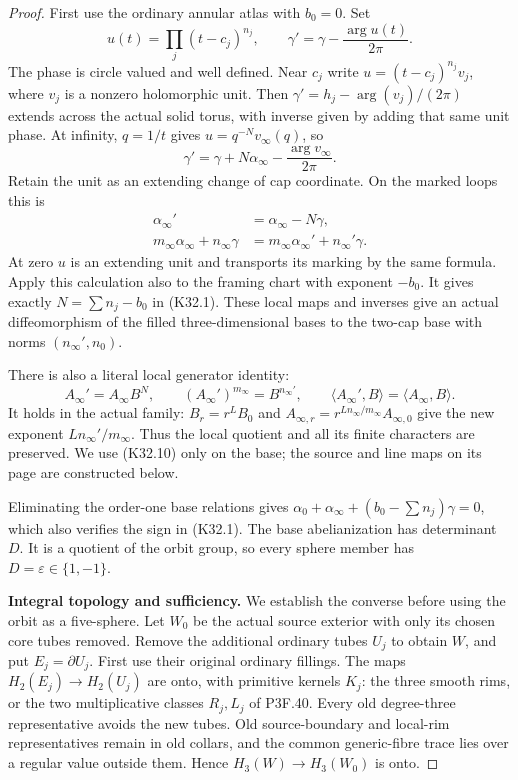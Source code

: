 \begin{proof}
First use the ordinary annular atlas with $b_0=0$. Set
\[
 u(t)=\prod_j(t-c_j)^{n_j},\qquad
 \gamma'=\gamma-\frac{\arg u(t)}{2\pi}.                 \tag{K32.10}
\]
The phase is circle valued and well defined. Near $c_j$
write $u=(t-c_j)^{n_j}v_j$, where $v_j$ is a nonzero
holomorphic unit. Then
$\gamma'=h_j-\arg(v_j)/(2\pi)$ extends across the actual
solid torus, with inverse given by adding that same unit
phase. At infinity, $q=1/t$ gives $u=q^{-N}v_\infty(q)$,
so
\[
 \gamma'=\gamma+N\alpha_\infty
                         -\frac{\arg v_\infty}{2\pi}.
\]
Retain the unit as an extending change of cap coordinate.
On the marked loops this is
\[
 \begin{split}
 \alpha_\infty'&=\alpha_\infty-N\gamma,\\
 m_\infty\alpha_\infty+n_\infty\gamma
  &=m_\infty\alpha_\infty'+n_\infty'\gamma.             
 \end{split}\tag{K32.11}
\]
At zero $u$ is an extending unit and transports its
marking by the same formula. Apply this calculation
also to the framing chart with exponent $-b_0$.
It gives exactly $N=\sum n_j-b_0$ in (K32.1).
These local maps and inverses give an actual diffeomorphism
of the filled three-dimensional bases to the two-cap base
with norms $(n_\infty',n_0)$.

There is also a literal local generator identity:
\[
 A_\infty'=A_\infty B^N,\qquad
 (A_\infty')^{m_\infty}=B^{n_\infty'},\qquad
 \langle A_\infty',B\rangle=\langle A_\infty,B\rangle.
                                                               \tag{K32.12}
\]
It holds in the actual family:
$B_r=r^LB_0$ and
$A_{\infty,r}=r^{Ln_\infty/m_\infty}A_{\infty,0}$
give the new exponent $Ln_\infty'/m_\infty$.
Thus the local quotient and all its finite characters
are preserved. We use (K32.10) only on the base;
the source and line maps on its page are constructed below.

Eliminating the order-one base relations gives
$\alpha_0+\alpha_\infty+(b_0-\sum n_j)\gamma=0$,
which also verifies the sign in (K32.1).
The base abelianization has determinant $D$. It is a
quotient of the orbit group, so every sphere member has
$D=\varepsilon\in\{1,-1\}$.

\par\medskip\noindent\textbf{Integral topology and sufficiency.}
We establish the converse before using the orbit as a
five-sphere. Let $W_0$ be the actual source exterior with
only its chosen core tubes removed. Remove the additional
ordinary tubes $U_j$ to obtain $W$, and put
$E_j=\partial U_j$. First use their original ordinary
fillings. The maps $H_2(E_j)\to H_2(U_j)$ are onto, with
primitive kernels $K_j$: the three smooth rims, or the
two multiplicative classes $R_j,L_j$ of P3F.40.
Every old degree-three representative avoids the new
tubes. Old source-boundary and local-rim representatives
remain in old collars, and the common generic-fibre
trace lies over a regular value outside them. Hence
$H_3(W)\to H_3(W_0)$ is onto.


\end{proof}

